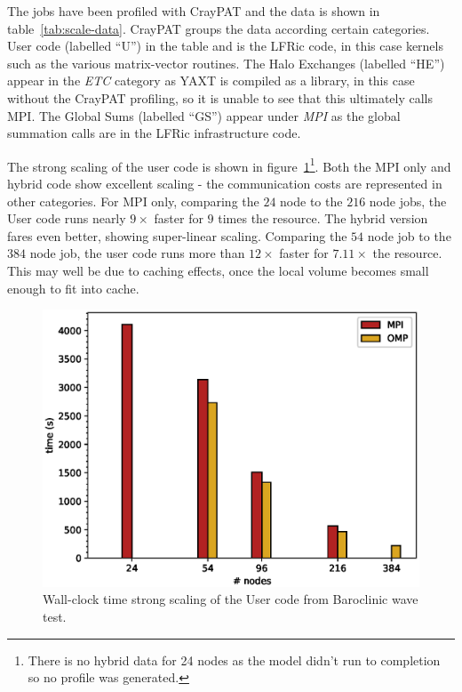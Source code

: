 The jobs have been profiled with CrayPAT and the data is shown in
table~\ref{tab:scale-data}. CrayPAT groups the data according certain
categories. User code (labelled ``U'') in the table and is the LFRic
code, in this case kernels such as the various matrix-vector
routines. The Halo Exchanges (labelled ``HE'') appear in the {\em ETC}
category as YAXT is compiled as a library, in this case without the
CrayPAT profiling, so it is unable to see that this ultimately calls
MPI. The Global Sums (labelled ``GS'') appear under {\em MPI} as the
global summation calls are in the LFRic infrastructure code.

The strong scaling of the user code is shown in
figure~\ref{fig:U_scale}\footnote{There is no hybrid data for 24 nodes
  as the model didn't run to completion so no profile was generated.}.
Both the MPI only and hybrid code show excellent scaling - the
communication costs are represented in other categories. For MPI
only, comparing the $24$ node to the $216$ node jobs, the User code
runs nearly $9\times$ faster for $9$ times the resource. The hybrid
version fares even better, showing super-linear scaling. Comparing the
$54$ node job to the $384$ node job, the user code runs more than
$12\times$ faster for $7.11\times$ the resource. This may well be due
to caching effects, once the local volume becomes small enough to fit
into cache.


\begin{figure}
\centering\includegraphics[width=1.0\linewidth]{figs/U-scale.eps}
\caption{\label{fig:U_scale}Wall-clock time strong scaling of the 
  User code from Baroclinic wave test.}
\end{figure} 

